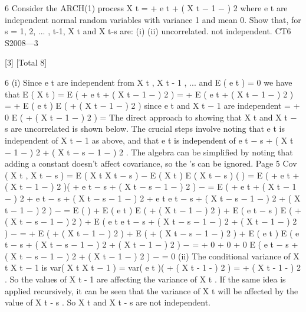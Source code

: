 \documentclass[a4paper,12pt]{article}
\begin{document}
6
Consider the ARCH(1) process
X t = \mu + e t  +  ( X t − 1 − \mu ) 2
where e t are independent normal random variables with variance 1 and mean 0.
Show that, for s = 1, 2, ... , t-1, X t and X t-s are:
(i)
(ii)
uncorrelated.
not independent.
CT6 S2008—3

[3]
[Total 8]


6
(i)
Since e t are independent from X t , X t - 1 , ... and E ( e t ) = 0 we have that
E ( X t ) = E ( \mu + e t  +  ( X t − 1 − \mu ) 2 )
= \mu + E ( e t  +  ( X t − 1 − \mu ) 2 )
= \mu + E ( e t ) E (  +  ( X t − 1 − \mu ) 2 ) since e t and X t − 1 are independent
= \mu + 0 \times  E (  +  ( X t − 1 − \mu ) 2 )
=\mu
The direct approach to showing that X t and X t − s are uncorrelated is shown
below. The crucial steps involve noting that e t is independent of X t − 1 as
above, and that e t is independent of
e t − s  +  ( X t − 1 − \mu ) 2  +  ( X t − s − 1 − \mu ) 2 .
The algebra can be simplified by noting that adding a constant doesn’t affect
covariance, so the \mu ’s can be ignored.
Page 5%
Cov ( X t , X t − s ) = E ( X t X t − s ) − E ( X t ) E ( X t − s )
(
)
= E ( \mu + e t  +  ( X t − 1 − \mu ) 2 )( \mu + e t − s  +  ( X t − s − 1 − \mu ) 2 ) − 
= E (  + \mu e t  +  ( X t − 1 − \mu ) 2 + \mu e t − s  +  ( X t − s − 1 − \mu ) 2
+ e t e t − s  +  ( X t − s − 1 − \mu ) 2  +  ( X t − 1 − \mu ) 2 ) − 
= E (  ) + \mu E ( e t ) E (  +  ( X t − 1 − \mu ) 2 ) + \mu E ( e t − s ) E (  +  ( X t − s − 1 − \mu ) 2 )
+ E ( e t e t − s  +  ( X t − s − 1 − \mu ) 2  +  ( X t − 1 − \mu ) 2 ) − 
=  + \mu {} \times  E (  +  ( X t − 1 − \mu ) 2 ) + \mu {} \times  E (  +  ( X t − s − 1 − \mu ) 2 )
+ E ( e t ) E ( e t − s  +  ( X t − s − 1 − \mu ) 2  +  ( X t − 1 − \mu ) 2 ) − 
=  + 0 + 0 + 0 \times  E ( e t − s  +  ( X t − s − 1 − \mu ) 2  +  ( X t − 1 − \mu ) 2 ) − 
= 0
(ii)
The conditional variance of X t X t − 1 is
var( X t X t − 1 ) = var( e t )(  +  ( X t - 1 - \mu ) 2 ) =  +  ( X t - 1 - \mu ) 2 .
So the values of X t - 1 are affecting the variance of X t . If the same idea is
applied recursively, it can be seen that the variance of X t will be affected by
the value of X t - s . So X t and X t - s are not independent.
\end{document}
